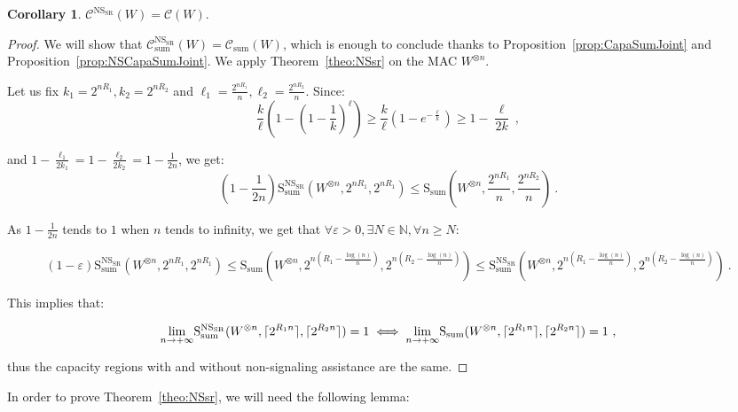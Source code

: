 \documentclass[11pt]{article}
\theoremstyle{definition}
\newtheorem{cor}[theo]{Corollary}
\theoremstyle{remark}
\DeclarePairedDelimiter\ceil{\lceil}{\rceil}
\begin{document}
\begin{cor}
  \label{cor:NSsr}
  $\mathcal{C}^{\mathrm{NS}_{\mathrm{SR}}}(W)=\mathcal{C}(W)$.
\end{cor}
\begin{proof}
  We will show that $\mathcal{C}_{\text{sum}}^{\mathrm{NS}_{\mathrm{SR}}}(W)=\mathcal{C}_{\text{sum}}(W)$, which is enough to conclude thanks to Proposition~\ref{prop:CapaSumJoint} and Proposition~\ref{prop:NSCapaSumJoint}. We apply Theorem~\ref{theo:NSsr} on the MAC $W^{\otimes n}$.

  Let us fix $k_1=2^{nR_1},k_2=2^{nR_2}$ and $\ell_1=\frac{2^{nR_1}}{n},\ell_2=\frac{2^{nR_2}}{n}$. Since:
  \[ \frac{k}{\ell}\left(1-\left(1-\frac{1}{k}\right)^{\ell}\right) \geq \frac{k}{\ell}\left(1-e^{-\frac{\ell}{k}}\right) \geq 1 - \frac{\ell}{2k} \ ,\]

  and $1 - \frac{\ell_1}{2k_1} = 1 - \frac{\ell_2}{2k_2} = 1 - \frac{1}{2n}$, we get:
\[ \left(1-\frac{1}{2n}\right)\mathrm{S}_{\text{sum}}^{\mathrm{NS}_{\mathrm{SR}}}(W^{\otimes n},2^{nR_1},2^{nR_1}) \leq \mathrm{S}_{\text{sum}}\left(W^{\otimes n},\frac{2^{nR_1}}{n},\frac{2^{nR_2}}{n}\right)\ . \]

  As $1-\frac{1}{2n}$ tends to $1$ when $n$ tends to infinity, we get that $\forall \varepsilon > 0, \exists N \in \mathbb{N}, \forall n\geq N$:

\[(1-\varepsilon)\mathrm{S}_{\text{sum}}^{\mathrm{NS}_{\mathrm{SR}}}(W^{\otimes n},2^{nR_1},2^{nR_1}) \leq \mathrm{S}_{\text{sum}}(W^{\otimes n},2^{n(R_1-\frac{\log(n)}{n})},2^{n(R_2-\frac{\log(n)}{n})}) \leq \mathrm{S}_{\text{sum}}^{\mathrm{NS}_{\mathrm{SR}}}(W^{\otimes n},2^{n(R_1-\frac{\log(n)}{n})},2^{n(R_2-\frac{\log(n)}{n})}) \ . \]

This implies that:

\[ \underset{n \rightarrow +\infty}{\lim} \mathrm{S}_{\text{sum}}^{\mathrm{NS}_{\mathrm{SR}}}(W^{\otimes n},\ceil{2^{R_1n}},\ceil{2^{R_2n}}) = 1 \iff \underset{n \rightarrow +\infty}{\lim} \mathrm{S}_{\text{sum}}(W^{\otimes n},\ceil{2^{R_1n}},\ceil{2^{R_2n}}) = 1 \ ,\]

thus the capacity regions with and without non-signaling assistance are the same.
\end{proof}

In order to prove Theorem~\ref{theo:NSsr}, we will need the following lemma:
\end{document}

